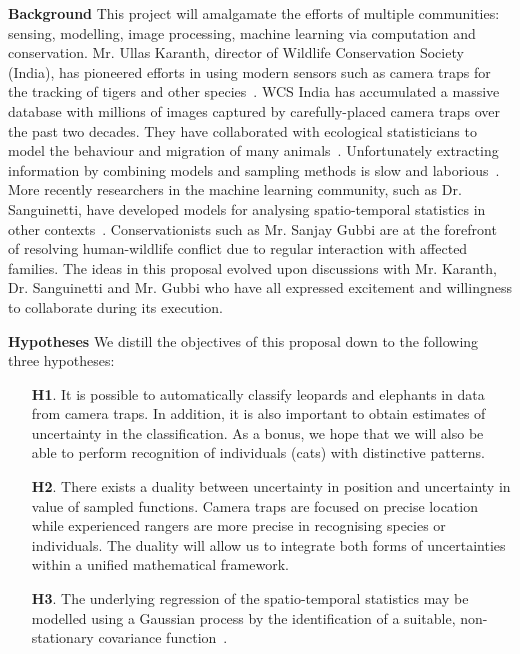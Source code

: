 \documentclass[a4paper,10pt,twocolumn]{article}
\newcommand{\hdg}[1] {\noindent \textbf{#1} }
\begin{document}
\hdg{Background}
This project will amalgamate the efforts of multiple communities: sensing, modelling, image processing, machine learning via computation and conservation. Mr. Ullas Karanth, director of Wildlife Conservation Society (India), has pioneered efforts in using modern sensors such as camera traps for the tracking of tigers and other species~\cite{}. WCS India has accumulated a massive database with millions of images captured by carefully-placed camera traps over the past two decades. They have collaborated with ecological statisticians to model the behaviour and migration of many animals~\cite{}. Unfortunately extracting information by combining models and sampling methods is slow and laborious~\cite{karanth1992population}. More recently researchers in the machine learning community, such as Dr. Sanguinetti, have developed models for analysing spatio-temporal statistics in other contexts~\cite{}. Conservationists such as Mr. Sanjay Gubbi are at the forefront of resolving human-wildlife conflict due to regular interaction with affected families. The ideas in this proposal evolved upon discussions with Mr. Karanth, Dr. Sanguinetti and Mr. Gubbi who have all expressed excitement and willingness to collaborate during its execution.  

\hdg{Hypotheses}
We distill the objectives of this proposal down to the following three hypotheses:
\begin{itemize}[topsep=-2.1ex,itemsep=-.7ex,leftmargin=1ex,itemindent=3ex]
 \item [\textbf{H1}.] It is possible to automatically classify leopards and elephants in data from camera traps. In addition, it is also important to obtain estimates of uncertainty in the classification. As a bonus, we hope that we will also be able to perform recognition of individuals (cats) with distinctive patterns.
 \item [\textbf{H2}.] There exists a duality between uncertainty in position and uncertainty in value of sampled functions. Camera traps are focused on precise location while experienced rangers are more precise in recognising species or individuals. The duality will allow us to integrate both forms of uncertainties within a unified mathematical framework.
 \item [\textbf{H3}.] The underlying regression of the spatio-temporal statistics may be modelled using a Gaussian process by the identification of a suitable, non-stationary covariance function~\cite{paciorek2003nonstationary}.
\end{itemize}
\vspace{2.5ex}
% 
\end{document}
